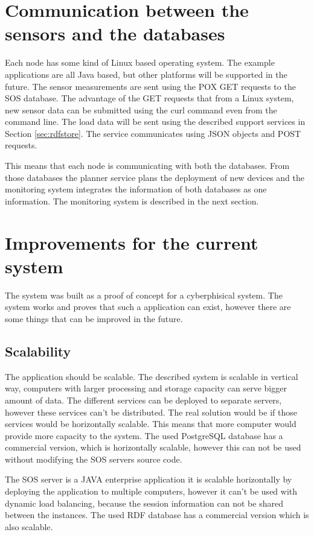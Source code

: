 \section{Communication between the sensors and the databases}

Each node has some kind of Linux based operating system. The example applications are all Java based, but other platforms will be supported in the future. The sensor measurements are sent using the POX GET requests to the SOS database. The advantage of the GET requests that from a Linux system, new sensor data can be submitted using the curl command even from the command line.  The load data will be sent using the described support services in Section \ref{sec:rdfstore}. The service communicates using JSON objects and POST requests.

This means that each node is communicating with both the databases. From those databases the planner service plans the deployment of new devices and the monitoring system integrates the information of both databases as one information. The monitoring system is described in the next section.

\section{Improvements for the current system}

The system was built as a proof of concept for a cyberphisical system. The system works and proves that such a application can exist, however there are some things that can be improved in the future. 

\subsection{Scalability}

The application should be scalable. The described system is scalable in vertical way, computers with larger processing and storage capacity can serve bigger amount of data. The different services can be deployed to separate servers, however these services can't be distributed. The real solution would be if those services would be horizontally scalable. This means that more computer would provide more capacity to the system. The used PostgreSQL database has a commercial version, which is horizontally scalable, however this can not be used without modifying the SOS servers source code.  

The SOS server is a JAVA enterprise application it is scalable horizontally by deploying the application to multiple computers, however it can't be used with dynamic load balancing, because the session information can not be shared between the instances. The used RDF database has a commercial version which is also scalable.

